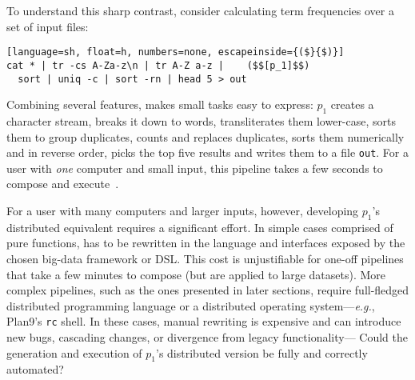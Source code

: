 \documentclass[sigplan,10pt,review,anonymous]{acmart}
\newcommand{\eg}{{\em e.g.}, }
\newcommand{\ttt}[1]{\texttt{\small #1}}
\begin{document}
To understand this sharp contrast, consider calculating term frequencies over a set of input files:


\begin{lstlisting}[language=sh, float=h, numbers=none, escapeinside={($}{$)}]
cat * | tr -cs A-Za-z\n | tr A-Z a-z |    ($$[p_1]$$)
  sort | uniq -c | sort -rn | head 5 > out
\end{lstlisting}

Combining several features, \unix makes small tasks easy to express:
  $p_1$ creates a character stream, breaks it down to words, transliterates them lower-case, sorts them to group duplicates, counts and replaces duplicates, sorts them numerically and in reverse order, picks the top five results and writes them to a file \ttt{out}.
For a user with \emph{one} computer and small input, this pipeline takes a few seconds to compose and execute~\cite{bentley1986literate}.




For a user with many computers and larger inputs, however, developing $p_1$'s distributed equivalent requires a significant effort.
In simple cases comprised of pure functions, has to be rewritten in the language and interfaces exposed by the chosen big-data framework or DSL.
This cost is unjustifiable for one-off pipelines that take a few minutes to compose (but are applied to large datasets).
More complex pipelines, such as the ones presented in later sections, require full-fledged distributed programming language or a distributed operating system---\eg Plan9's \ttt{rc} shell.
In these cases, manual rewriting is expensive and can introduce new bugs, cascading changes, or divergence from legacy functionality---
Could the generation and execution of $p_1$'s distributed version be fully and correctly automated?
\end{document}
